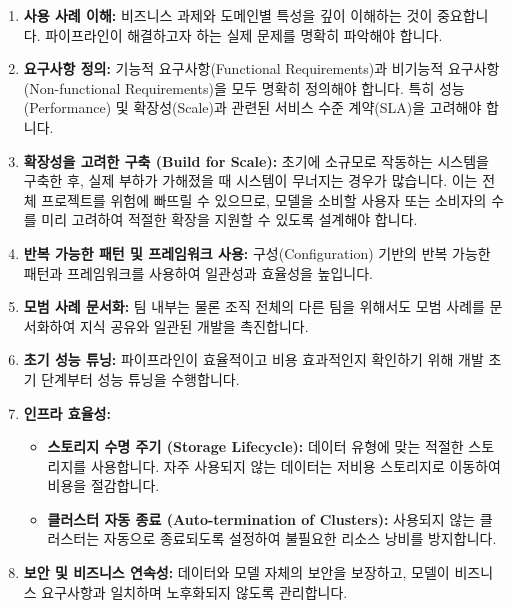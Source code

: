 \documentclass[11pt,a4paper]{article}
\begin{document}
\begin{enumerate}
    \item \textbf{사용 사례 이해:}
    비즈니스 과제와 도메인별 특성을 깊이 이해하는 것이 중요합니다. 파이프라인이 해결하고자 하는 실제 문제를 명확히 파악해야 합니다.

    \item \textbf{요구사항 정의:}
    기능적 요구사항(Functional Requirements)과 비기능적 요구사항(Non-functional Requirements)을 모두 명확히 정의해야 합니다. 특히 성능(Performance) 및 확장성(Scale)과 관련된 서비스 수준 계약(SLA)을 고려해야 합니다.

    \item \textbf{확장성을 고려한 구축 (Build for Scale):}
    초기에 소규모로 작동하는 시스템을 구축한 후, 실제 부하가 가해졌을 때 시스템이 무너지는 경우가 많습니다. 이는 전체 프로젝트를 위험에 빠뜨릴 수 있으므로, 모델을 소비할 사용자 또는 소비자의 수를 미리 고려하여 적절한 확장을 지원할 수 있도록 설계해야 합니다.

    \item \textbf{반복 가능한 패턴 및 프레임워크 사용:}
    구성(Configuration) 기반의 반복 가능한 패턴과 프레임워크를 사용하여 일관성과 효율성을 높입니다.

    \item \textbf{모범 사례 문서화:}
    팀 내부는 물론 조직 전체의 다른 팀을 위해서도 모범 사례를 문서화하여 지식 공유와 일관된 개발을 촉진합니다.

    \item \textbf{초기 성능 튜닝:}
    파이프라인이 효율적이고 비용 효과적인지 확인하기 위해 개발 초기 단계부터 성능 튜닝을 수행합니다.

    \item \textbf{인프라 효율성:}
    \begin{itemize}
        \item \textbf{스토리지 수명 주기 (Storage Lifecycle):} 데이터 유형에 맞는 적절한 스토리지를 사용합니다. 자주 사용되지 않는 데이터는 저비용 스토리지로 이동하여 비용을 절감합니다.
        \item \textbf{클러스터 자동 종료 (Auto-termination of Clusters):} 사용되지 않는 클러스터는 자동으로 종료되도록 설정하여 불필요한 리소스 낭비를 방지합니다.
    \end{itemize}

    \item \textbf{보안 및 비즈니스 연속성:}
    데이터와 모델 자체의 보안을 보장하고, 모델이 비즈니스 요구사항과 일치하며 노후화되지 않도록 관리합니다.


\end{enumerate}
\end{document}
